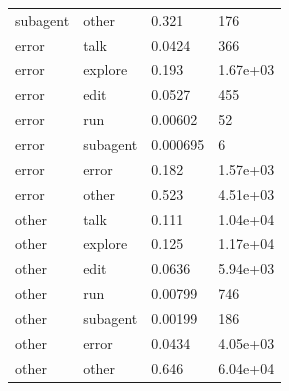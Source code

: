 \begin{tabular}{llll}
subagent & other & 0.321 & 176 \\
error & talk & 0.0424 & 366 \\
error & explore & 0.193 & 1.67e+03 \\
error & edit & 0.0527 & 455 \\
error & run & 0.00602 & 52 \\
error & subagent & 0.000695 & 6 \\
error & error & 0.182 & 1.57e+03 \\
error & other & 0.523 & 4.51e+03 \\
other & talk & 0.111 & 1.04e+04 \\
other & explore & 0.125 & 1.17e+04 \\
other & edit & 0.0636 & 5.94e+03 \\
other & run & 0.00799 & 746 \\
other & subagent & 0.00199 & 186 \\
other & error & 0.0434 & 4.05e+03 \\
other & other & 0.646 & 6.04e+04 \\
\bottomrule
\end{tabular}